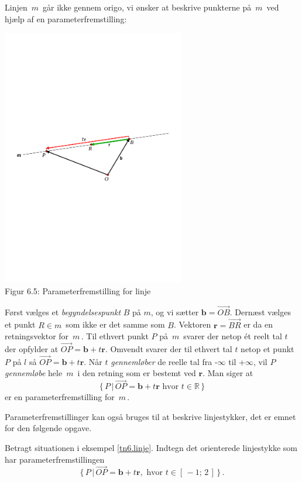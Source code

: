 \begin{example}\label{tn6.linje}
Linjen $\,m\,$ går ikke gennem origo, vi ønsker at beskrive punkterne på $\,m\,$ ved hjælp af en parameterfremstil\-ling:
\begin{center}
		\includegraphics[trim=1cm 11.5cm 1cm
 11.5cm,width=0.60\textwidth,clip]{geometer/vektor8.pdf}
 \\Figur 6.5: Parameterfremstilling for linje 
\end{center}
Først vælges et \textit{begyndelsespunkt} $B$ på $m$, og vi sætter $\mathbf b=\stackrel{\rightarrow}{OB}$. Dernæst vælges et punkt $R \in m\,$ som ikke er det samme som $B$.  Vektoren $\mathbf r=\stackrel{\rightarrow}{BR}$ er da en retningsvektor for $\,m\,$. Til ethvert punkt $P$ på $\,m\,$ svarer der netop ét reelt tal $t$ der opfylder at $\stackrel{\rightarrow}{OP}=\mathbf b+t\mathbf r$. Omvendt svarer der til ethvert tal $t$ netop et punkt $P$ på $l$ så $\stackrel{\rightarrow}{OP}=\mathbf b+t\mathbf r$. Når $t$ \textit{gennemløber} de reelle tal fra -$\infty$ til +$\infty$, vil $P$ \textit{gennemløbe} hele $\,m\,$ i den retning som er bestemt ved $\mathbf r$. Man siger at 
$$\{\,P\,|\,\stackrel{\rightarrow}{OP}=\mathbf b +t\mathbf r\,\,\mathrm{hvor}\,\,t \in \mathbb R\,\}$$
er en parameterfremstilling for $\,m\,$.
\end{example}
Parameterfremstillinger kan også bruges til at beskrive linjestykker, det er emnet for den følgende opgave.
\begin{exercise}
Betragt situationen i eksempel \ref{tn6.linje}. Indtegn det orienterede linjestykke som har parameterfremstillingen
$$\{\,P\,|\,\stackrel{\rightarrow}{OP}=\mathbf b+t\mathbf r,\,\,\mathrm{hvor}\,\,t \in \left[\,- 1;\,2\,\right]\,\}\,.$$
\end{exercise}

